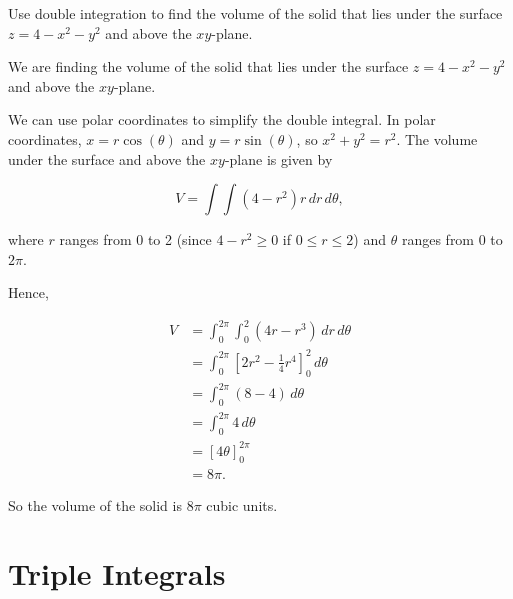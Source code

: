 \begin{Exercise}[title={Using Polar Coordinates in Multiple Integration}, 
label=polarmulti]

\Question Use double integration to find the volume of the solid that lies under the surface $z = 4 - x^2 - y^2$ and above the $xy$-plane.

\end{Exercise}
\begin{Answer}[ref=polarmulti]

We are finding the volume of the solid that lies under the surface $z = 4 - x^2 - y^2$ and above the $xy$-plane.


We can use polar coordinates to simplify the double integral. In polar coordinates, $x = r\cos(\theta)$ and $y = r\sin(\theta)$, so $x^2 + y^2 = r^2$. The volume under the surface and above the $xy$-plane is given by

\begin{equation}
V = \int \int (4 - r^2) r \, dr \, d\theta,
\end{equation}

where $r$ ranges from 0 to 2 (since $4 - r^2 \geq 0$ if $0 \leq r \leq 2$) and $\theta$ ranges from 0 to $2\pi$.

Hence,

\begin{align*}
V & = \int_{0}^{2\pi} \int_{0}^{2} (4r - r^3) \, dr \, d\theta \\
& = \int_{0}^{2\pi} \left[ 2r^2 - \frac{1}{4}r^4 \right]_{0}^{2} \, d\theta \\
& = \int_{0}^{2\pi} (8 - 4) \, d\theta \\
& = \int_{0}^{2\pi} 4 \, d\theta \\
& = \left[ 4\theta \right]_{0}^{2\pi} \\
& = 8\pi.
\end{align*}

So the volume of the solid is $8\pi$ cubic units.

\end{Answer}

\section{Triple Integrals}
